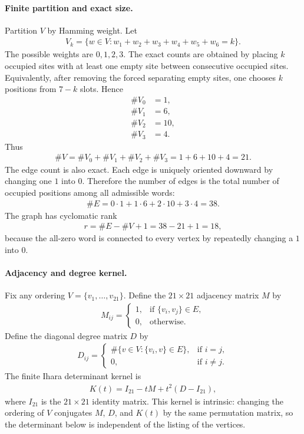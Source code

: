 \paragraph{Finite partition and exact size.}
Partition $V$ by Hamming weight.  Let
$$
\begin{aligned}
V_k=\{w \in V : w_1+w_2+w_3+w_4+w_5+w_6=k\}.
\end{aligned}
$$
The possible weights are $0,1,2,3$.  The exact counts are obtained by placing $k$ occupied sites with at least one empty site between consecutive occupied sites.  Equivalently, after removing the forced separating empty sites, one chooses $k$ positions from $7-k$ slots.  Hence
$$
\begin{aligned}
\#V_0&=1,\\
\#V_1&=6,\\
\#V_2&=10,\\
\#V_3&=4.
\end{aligned}
$$
Thus
$$
\begin{aligned}
\#V=\#V_0+\#V_1+\#V_2+\#V_3=1+6+10+4=21.
\end{aligned}
$$
The edge count is also exact.  Each edge is uniquely oriented downward by changing one $1$ into $0$.  Therefore the number of edges is the total number of occupied positions among all admissible words:
$$
\begin{aligned}
\#E=0\cdot 1+1\cdot 6+2\cdot 10+3\cdot 4=38.
\end{aligned}
$$
The graph has cyclomatic rank
$$
\begin{aligned}
r=\#E-\#V+1=38-21+1=18,
\end{aligned}
$$
because the all-zero word is connected to every vertex by repeatedly changing a $1$ into $0$.

\paragraph{Adjacency and degree kernel.}
Fix any ordering $V=\{v_1,\ldots,v_{21}\}$.  Define the $21 \times 21$ adjacency matrix $M$ by
$$
\begin{aligned}
M_{ij}=\begin{cases}
1, & \text{if } \{v_i,v_j\}\in E,\\
0, & \text{otherwise.}
\end{cases}
\end{aligned}
$$
Define the diagonal degree matrix $D$ by
$$
\begin{aligned}
D_{ij}=\begin{cases}
\#\{v \in V : \{v_i,v\}\in E\}, & \text{if } i=j,\\
0, & \text{if } i\ne j.
\end{cases}
\end{aligned}
$$
The finite Ihara determinant kernel is
$$
\begin{aligned}
K(t)=I_{21}-tM+t^2(D-I_{21}),
\end{aligned}
$$
where $I_{21}$ is the $21 \times 21$ identity matrix.  This kernel is intrinsic: changing the ordering of $V$ conjugates $M$, $D$, and $K(t)$ by the same permutation matrix, so the determinant below is independent of the listing of the vertices.

